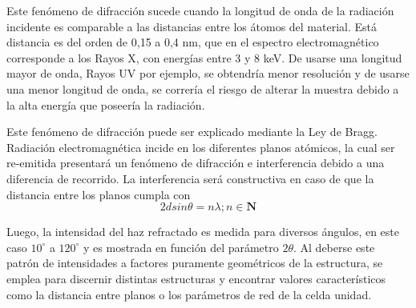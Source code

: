 \documentclass{article}
\theoremstyle{definition}
\theoremstyle{remark}
\begin{document}
\begin{figure}[H]
\centering
{}
\end{figure}
 
 Este fenómeno de difracción sucede cuando la longitud de onda de la radiación incidente es comparable a las distancias entre los átomos del material. Está distancia es del orden de 0,15 a 0,4 nm, que en el espectro electromagnético corresponde a los Rayos X, con energías entre 3 y 8 keV. De usarse una longitud mayor de onda, Rayos UV por ejemplo, se obtendría menor resolución y de usarse una menor longitud de onda, se correría el riesgo de alterar la muestra debido a la alta energía que poseería la radiación.
 
 
 Este fenómeno de difracción puede ser explicado mediante la Ley de Bragg. Radiación electromagnética incide en los diferentes planos atómicos, la cual ser re-emitida presentará un fenómeno de difracción e interferencia debido a una diferencia de recorrido. La interferencia será constructiva en caso de que la distancia entre los planos cumpla con
 \begin{equation}
 2d sin \theta =n \lambda; n \in \mathbf{N}
 \end{equation}
 
 
 Luego, la intensidad del haz refractado es medida para diversos ángulos, en este caso $10^{\circ}$ a $120^{\circ}$ y es mostrada en función del parámetro $2\theta$. Al deberse este patrón de intensidades  a factores puramente geométricos de la estructura, se emplea para discernir distintas estructuras y encontrar valores característicos como la distancia entre planos o los parámetros de red de la celda unidad.
\end{document}
